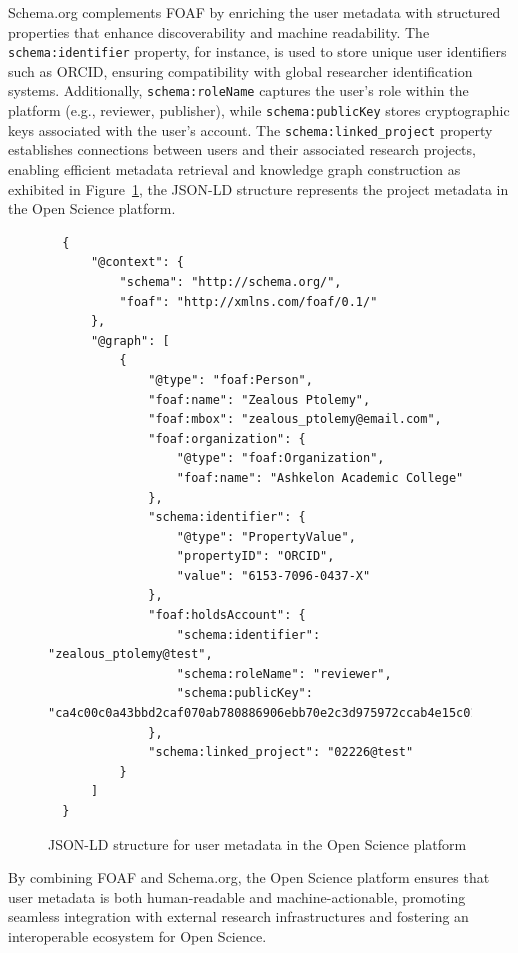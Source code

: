 \documentclass{article}
\begin{document}
Schema.org complements FOAF by enriching the user metadata with structured properties that enhance discoverability and machine readability. The \texttt{schema:identifier} property, for instance, is used to store unique user identifiers such as ORCID, ensuring compatibility with global researcher identification systems. Additionally, \texttt{schema:roleName} captures the user’s role within the platform (e.g., reviewer, publisher), while \texttt{schema:publicKey} stores cryptographic keys associated with the user’s account. The \texttt{schema:linked\_project} property establishes connections between users and their associated research projects, enabling efficient metadata retrieval and knowledge graph construction as exhibited in Figure~\ref{jsonld:user}, the JSON-LD structure represents the project metadata in the Open Science platform.



\begin{figure}[h]
      \centering
      \caption{JSON-LD structure for user metadata in the Open Science platform}
      \label{jsonld:user}
      \begin{verbatim}
  {
      "@context": {
          "schema": "http://schema.org/",
          "foaf": "http://xmlns.com/foaf/0.1/"
      },
      "@graph": [
          {
              "@type": "foaf:Person",
              "foaf:name": "Zealous Ptolemy",
              "foaf:mbox": "zealous_ptolemy@email.com",
              "foaf:organization": {
                  "@type": "foaf:Organization",
                  "foaf:name": "Ashkelon Academic College"
              },
              "schema:identifier": {
                  "@type": "PropertyValue",
                  "propertyID": "ORCID",
                  "value": "6153-7096-0437-X"
              },
              "foaf:holdsAccount": {
                  "schema:identifier": "zealous_ptolemy@test",
                  "schema:roleName": "reviewer",
                  "schema:publicKey": "ca4c00c0a43bbd2caf070ab780886906ebb70e2c3d975972ccab4e15c01f33bd"
              },
              "schema:linked_project": "02226@test"
          }
      ]
  }
  \end{verbatim}
\end{figure}



By combining FOAF and Schema.org, the Open Science platform ensures that user metadata is both human-readable and machine-actionable, promoting seamless integration with external research infrastructures and fostering an interoperable ecosystem for Open Science.
\end{document}
